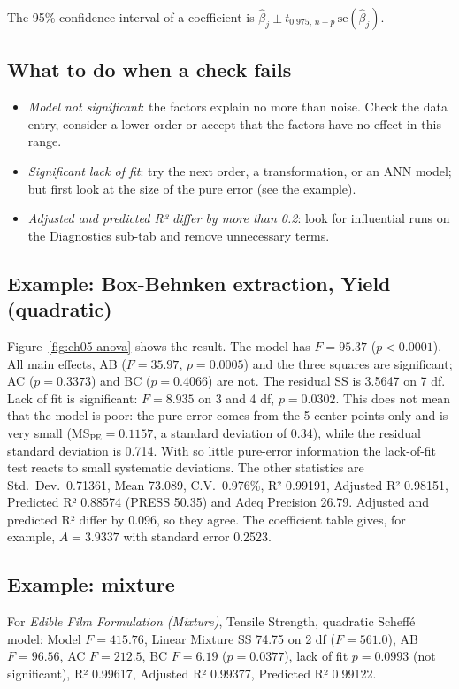 The 95\% confidence interval of a coefficient is $\hat\beta_j\pm t_{0.975,\,n-p}\,\text{se}(\hat\beta_j)$.

\subsection*{What to do when a check fails}
\begin{itemize}
  \item \emph{Model not significant}: the factors explain no more than noise. Check the data entry,
        consider a lower order or accept that the factors have no effect in this range.
  \item \emph{Significant lack of fit}: try the next order, a transformation, or an ANN model; but first
        look at the size of the pure error (see the example).
  \item \emph{Adjusted and predicted R² differ by more than 0.2}: look for influential runs on the
        Diagnostics sub-tab and remove unnecessary terms.
\end{itemize}

\subsection*{Example: Box-Behnken extraction, Yield (quadratic)}
Figure~\ref{fig:ch05-anova} shows the result. The model has $F=95.37$ ($p<0.0001$). All main effects, AB
($F=35.97$, $p=0.0005$) and the three squares are significant; AC ($p=0.3373$) and BC ($p=0.4066$) are not.
The residual SS is 3.5647 on 7 df. Lack of fit is significant: $F=8.935$ on 3 and 4 df, $p=0.0302$. This
does not mean that the model is poor: the pure error comes from the 5 center points only and is very small
($\text{MS}_{\text{PE}}=0.1157$, a standard deviation of 0.34), while the residual standard deviation is
0.714. With so little pure-error information the lack-of-fit test reacts to small systematic deviations.
The other statistics are Std.\ Dev.\ 0.71361, Mean 73.089, C.V.\ 0.976\%, R² 0.99191, Adjusted R² 0.98151,
Predicted R² 0.88574 (PRESS 50.35) and Adeq Precision 26.79. Adjusted and predicted R² differ by 0.096, so
they agree. The coefficient table gives, for example, $A=3.9337$ with standard error 0.2523.

\subsection*{Example: mixture}
For \emph{Edible Film Formulation (Mixture)}, Tensile Strength, quadratic Scheffé model: Model $F=415.76$,
Linear Mixture SS 74.75 on 2 df ($F=561.0$), AB $F=96.56$, AC $F=212.5$, BC $F=6.19$ ($p=0.0377$), lack of
fit $p=0.0993$ (not significant), R² 0.99617, Adjusted R² 0.99377, Predicted R² 0.99122.

